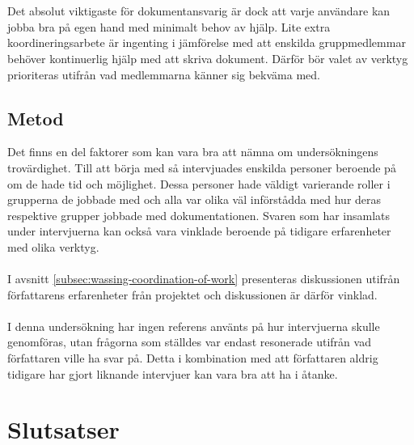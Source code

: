 \\ \\
Det absolut viktigaste för dokumentansvarig är dock att varje användare kan jobba bra på egen hand med minimalt behov av hjälp. Lite extra koordineringsarbete är ingenting i jämförelse med att enskilda gruppmedlemmar behöver kontinuerlig hjälp med att skriva dokument. Därför bör valet av verktyg prioriteras utifrån vad medlemmarna känner sig bekväma med.

\subsection{Metod}
\label{sec:wassing-discussion-method}
Det finns en del faktorer som kan vara bra att nämna om undersökningens trovärdighet. Till att börja med så intervjuades enskilda personer beroende på om de hade tid och möjlighet. Dessa personer hade väldigt varierande roller i grupperna de jobbade med och alla var olika väl införstådda med hur deras respektive grupper jobbade med dokumentationen. Svaren som har insamlats under intervjuerna kan också vara vinklade beroende på tidigare erfarenheter med olika verktyg.
\\ \\
I avsnitt \ref{subsec:wassing-coordination-of-work} presenteras diskussionen utifrån författarens erfarenheter från projektet och diskussionen är därför vinklad.
\\ \\
I denna undersökning har ingen referens använts på hur intervjuerna skulle genomföras, utan frågorna som ställdes var endast resonerade utifrån vad författaren ville ha svar på. Detta i kombination med att författaren aldrig tidigare har gjort liknande intervjuer kan vara bra att ha i åtanke.

\section{Slutsatser}
\label{cha:wassing-conclusion}
